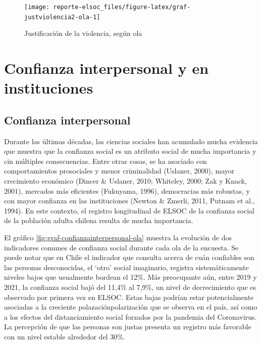 \documentclass[
  12pt,
]{book}
\begin{document}
\begin{figure}

{\centering \texttt{[image: reporte-elsoc\_files/figure-latex/graf-justviolencia2-ola-1]} 

}

\caption{Justificación de la violencia, según ola}\label{fig:graf-justviolencia2-ola}
\end{figure}

\hypertarget{confianza-interpersonal-y-en-instituciones}{%
\section{Confianza interpersonal y en instituciones}\label{confianza-interpersonal-y-en-instituciones}}

\hypertarget{confianza-interpersonal}{%
\subsection*{Confianza interpersonal}\label{confianza-interpersonal}}

Durante las últimas décadas, las ciencias sociales han acumulado mucha evidencia que muestra que la confianza social es un atributo social de mucha importancia y cin múltiples consecuencias. Entre otras cosas, se ha asociado con comportamientos prosociales y menor criminalidad (Uslaner, 2000), mayor crecimiento económico (Dincer \& Uslaner, 2010; Whiteley, 2000; Zak y Knack, 2001), mercados más eficientes (Fukuyama, 1996), democracias más robustas, y con mayor confianza en las instituciones (Newton \& Zmerli, 2011, Putnam et al., 1994). En este contexto, el registro longitudinal de ELSOC de la confianza social de la población adulta chilena resulta de mucha importancia.

El gráfico \ref{fig:graf-confianzainterpersonal-ola} muestra la evolución de dos indicadores comunes de confianza social durante cada ola de la encuesta. Se puede notar que en Chile el indicador que consulta acerca de cuán confiables son las personas desconocidas, el `otro' social imaginario, registra sistemáticamente niveles bajos que usualmente bordean el 12\%. Más preocupante aún, entre 2019 y 2021, la confianza social bajó del 11,4\% al 7,9\%, un nivel de decrecimiento que es observado por primera vez en ELSOC. Estas bajas podrían estar potencialmente asociadas a la creciente polazaciónpolarización que se observa en el país, así como a los efectos del distanciamiento social forzados por la pandemia del Coronavirus. La percepción de que las personas son justas presenta un registro más favorable con un nivel estable alrededor del 30\%.
\end{document}
